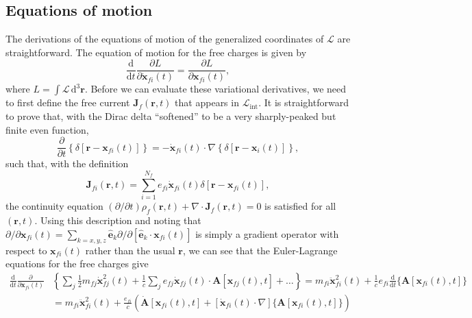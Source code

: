 \documentclass{article}
\begin{document}
\subsection{Equations of motion}

The derivations of the equations of motion of the generalized coordinates of $\mathcal{L}$ are straightforward. The equation of motion for the free charges is given by
\begin{equation}
\frac{\mathrm{d}}{\mathrm{d}t}\frac{\partial L}{\partial \dot{\mathbf{x}}_{fi}(t)} = \frac{\partial L}{\partial \mathbf{x}_{fi}(t)},
\end{equation}
where $L = \int\mathcal{L}\,\mathrm{d}^3\mathbf{r}$. Before we can evaluate these variational derivatives, we need to first define the free current $\mathbf{J}_f(\mathbf{r},t)$ that appears in $\mathcal{L}_\mathrm{int}$. It is straightforward to prove that, with the Dirac delta ``softened'' to be a very sharply-peaked but finite even function,
\begin{equation}
\frac{\partial}{\partial t}\left\{\delta[\mathbf{r} - \mathbf{x}_{fi}(t)]\right\} = -\dot{\mathbf{x}}_{fi}(t)\cdot\nabla\left\{\delta[\mathbf{r} - \mathbf{x}_i(t)]\right\},
\end{equation}
such that, with the definition
\begin{equation}
\mathbf{J}_{fi}(\mathbf{r},t) = \sum_{i = 1}^{N_f}e_{fi}\dot{\mathbf{x}}_{fi}(t)\delta[\mathbf{r} - \mathbf{x}_{fi}(t)],
\end{equation}
the continuity equation $(\partial/\partial t)\rho_f(\mathbf{r},t) + \nabla\cdot\mathbf{J}_f(\mathbf{r},t) = 0$ is satisfied for all $(\mathbf{r},t)$. Using this description and noting that $\partial/\partial \mathbf{x}_{fi}(t) = \sum_{k = x,y,z}\hat{\mathbf{e}}_k\partial/\partial [\hat{\mathbf{e}}_k\cdot\mathbf{x}_{fi}(t)]$ is simply a gradient operator with respect to $\mathbf{x}_{fi}(t)$ rather than the usual $\mathbf{r}$, we can see that the Euler-Lagrange equations for the free charges give
\begin{equation}
\begin{split}
\frac{\mathrm{d}}{\mathrm{d}t}\frac{\partial}{\partial \dot{\mathbf{x}}_{fi}(t)}&\left\{\sum_j\frac{1}{2}m_{fj}\dot{\mathbf{x}}_{fj}^2(t) + \frac{1}{c}\sum_je_{fj}\dot{\mathbf{x}}_{fj}(t)\cdot\mathbf{A}[\mathbf{x}_{fj}(t),t] + \ldots\right\} = m_{fi}\ddot{\mathbf{x}}_{fi}^2(t) + \frac{1}{c}e_{fi}\frac{\mathrm{d}}{\mathrm{d}t}\{\mathbf{A}[\mathbf{x}_{fi}(t),t]\}\\
&= m_{fi}\ddot{\mathbf{x}}_{fi}^2(t) + \frac{e_{fi}}{c}\left(\dot{\mathbf{A}}[\mathbf{x}_{fi}(t),t] + \left[\dot{\mathbf{x}}_{fi}(t)\cdot\nabla\right]\{\mathbf{A}[\mathbf{x}_{fi}(t),t]\}\right)
\end{split}
\end{equation}
\end{document}
